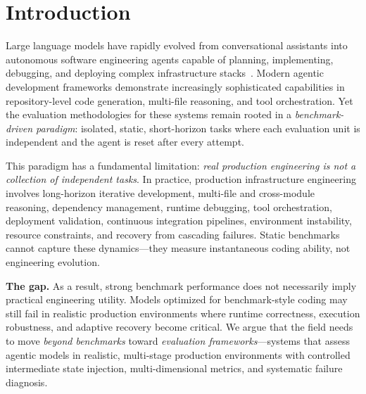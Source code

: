 \section{Introduction}

Large language models have rapidly evolved from conversational assistants into autonomous software engineering agents capable of planning, implementing, debugging, and deploying complex infrastructure stacks~\citep{jimenez2024swebench,liu2024agentbench,frontiereng2026}.
Modern agentic development frameworks demonstrate increasingly sophisticated capabilities in repository-level code generation, multi-file reasoning, and tool orchestration.
Yet the evaluation methodologies for these systems remain rooted in a \emph{benchmark-driven paradigm}: isolated, static, short-horizon tasks where each evaluation unit is independent and the agent is reset after every attempt.

This paradigm has a fundamental limitation: \emph{real production engineering is not a collection of independent tasks}.
In practice, production infrastructure engineering involves long-horizon iterative development, multi-file and cross-module reasoning, dependency management, runtime debugging, tool orchestration, deployment validation, continuous integration pipelines, environment instability, resource constraints, and recovery from cascading failures.
Static benchmarks cannot capture these dynamics---they measure instantaneous coding ability, not engineering evolution.

\textbf{The gap.}
As a result, strong benchmark performance does not necessarily imply practical engineering utility.
Models optimized for benchmark-style coding may still fail in realistic production environments where runtime correctness, execution robustness, and adaptive recovery become critical.
We argue that the field needs to move \emph{beyond benchmarks} toward \emph{evaluation frameworks}---systems that assess agentic models in realistic, multi-stage production environments with controlled intermediate state injection, multi-dimensional metrics, and systematic failure diagnosis.

